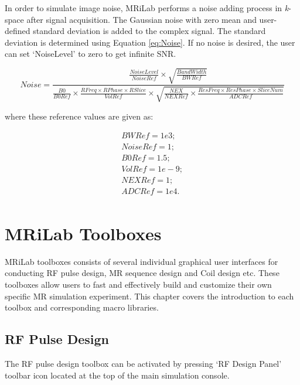 \documentclass{book}%
\begin{document}
In order to simulate image noise, MRiLab performs a noise adding process in \textit{k}-space after signal acquisition. The Gaussian noise with zero mean and user-defined standard deviation is added to the complex signal. The standard deviation is determined using Equation \ref{eq:Noise}. If no noise is desired, the user can set `NoiseLevel' to zero to get infinite SNR.

\begin{equation}
Noise = \frac{\frac{NoiseLevel}{NoiseRef} \times \sqrt{\frac{BandWidth}{BWRef}}}{\frac{B0}{B0Ref} \times \frac{RFreq \times RPhase \times RSlice}{VolRef}
				\times \sqrt{\frac{NEX}{NEXRef} \times \frac{ResFreq \times ResPhase \times SliceNum}{ADCRef}}}
\label{eq:Noise}
\end{equation}

where these reference values are given as:

\begin{equation}
\begin{aligned}
	BWRef  = 1e3; \\
	NoiseRef = 1; \\
	B0Ref  = 1.5; \\
  VolRef = 1e-9; \\
	NEXRef = 1; \\
	ADCRef = 1e4. \\
\label{eq:Noise2}
\end{aligned}
\end{equation}

\chapter{MRiLab Toolboxes} \label{chap:MRiLabToolboxes}

MRiLab toolboxes consists of several individual graphical user interfaces for conducting RF pulse design, MR sequence design and Coil design etc. These toolboxes allow users to fast and effectively build and customize their own specific MR simulation experiment. This chapter covers the introduction to each toolbox and corresponding macro libraries.

\section{RF Pulse Design}

The RF pulse design toolbox can be activated by pressing `RF Design Panel' toolbar icon located at the top of the main simulation console.
\end{document}
